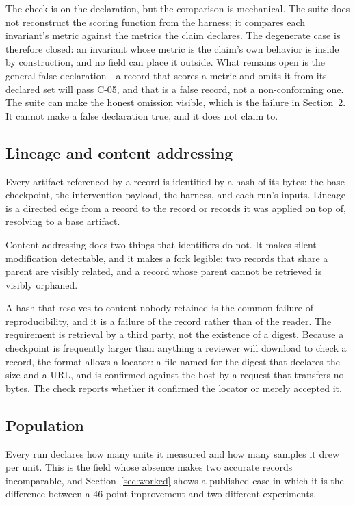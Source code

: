 \documentclass[11pt]{article}
\begin{document}
The check is on the declaration, but the comparison is mechanical. The suite
does not reconstruct the scoring function from the harness; it compares each
invariant's metric against the metrics the claim declares. The degenerate case
is therefore closed: an invariant whose metric is the claim's own behavior is
inside by construction, and no field can place it outside. What remains open is
the general false declaration---a record that scores a metric and omits it from
its declared set will pass C-05, and that is a false record, not a
non-conforming one. The suite can make the honest omission visible, which is the
failure in Section~2. It cannot make a false declaration true, and it does not
claim to.

\subsection{Lineage and content addressing}

Every artifact referenced by a record is identified by a hash of its bytes: the
base checkpoint, the intervention payload, the harness, and each run's inputs.
Lineage is a directed edge from a record to the record or records it was
applied on top of, resolving to a base artifact.

Content addressing does two things that identifiers do not. It makes silent
modification detectable, and it makes a fork legible: two records that share a
parent are visibly related, and a record whose parent cannot be retrieved is
visibly orphaned.

A hash that resolves to content nobody retained is the common failure of
reproducibility, and it is a failure of the record rather than of the reader.
The requirement is retrieval by a third party, not the existence of a digest.
Because a checkpoint is frequently larger than anything a reviewer will
download to check a record, the format allows a locator: a file named for the
digest that declares the size and a URL, and is confirmed against the host by a
request that transfers no bytes. The check reports whether it confirmed the
locator or merely accepted it.

\subsection{Population}

Every run declares how many units it measured and how many samples it drew per
unit. This is the field whose absence makes two accurate records incomparable,
and Section~\ref{sec:worked} shows a published case in which it is the
difference between a 46-point improvement and two different experiments.
\end{document}
